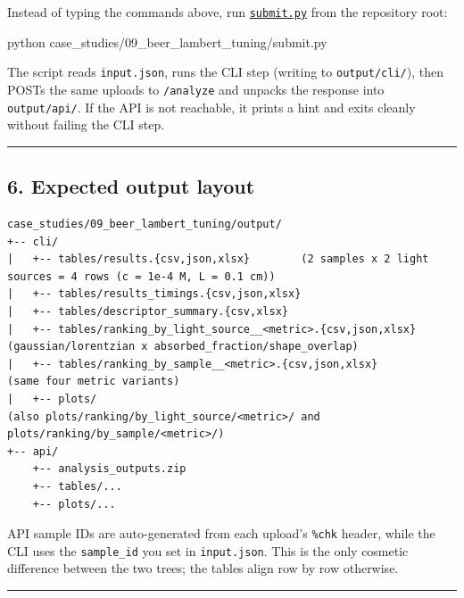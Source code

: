\documentclass[
  11pt,
]{article}
\newenvironment{Shaded}{}{}
\newcommand{\ExtensionTok}[1]{#1}
\newcommand{\NormalTok}[1]{#1}
\begin{document}
Instead of typing the commands above, run
\href{https://github.com/pinarsyt/overlap-calculator/blob/main/case_studies/09_beer_lambert_tuning/submit.py}{\texttt{submit.py}}
from the repository root:

\begin{Shaded}
\begin{Highlighting}[]
\ExtensionTok{python}\NormalTok{ case\_studies/09\_beer\_lambert\_tuning/submit.py}
\end{Highlighting}
\end{Shaded}

The script reads \texttt{input.json}, runs the CLI step (writing to
\texttt{output/cli/}), then POSTs the same uploads to \texttt{/analyze}
and unpacks the response into \texttt{output/api/}. If the API is not
reachable, it prints a hint and exits cleanly without failing the CLI
step.

\begin{center}\rule{0.5\linewidth}{0.5pt}\end{center}

\hypertarget{6-expected-output-layout}{
\subsection{6. Expected output layout}\label{6-expected-output-layout}}

\begin{verbatim}
case_studies/09_beer_lambert_tuning/output/
+-- cli/
|   +-- tables/results.{csv,json,xlsx}        (2 samples x 2 light sources = 4 rows (c = 1e-4 M, L = 0.1 cm))
|   +-- tables/results_timings.{csv,json,xlsx}
|   +-- tables/descriptor_summary.{csv,xlsx}
|   +-- tables/ranking_by_light_source__<metric>.{csv,json,xlsx}   (gaussian/lorentzian x absorbed_fraction/shape_overlap)
|   +-- tables/ranking_by_sample__<metric>.{csv,json,xlsx}          (same four metric variants)
|   +-- plots/                                                      (also plots/ranking/by_light_source/<metric>/ and plots/ranking/by_sample/<metric>/)
+-- api/
    +-- analysis_outputs.zip
    +-- tables/...
    +-- plots/...
\end{verbatim}

API sample IDs are auto-generated from each upload's \texttt{\%chk}
header, while the CLI uses the \texttt{sample\_id} you set in
\texttt{input.json}. This is the only cosmetic difference between the
two trees; the tables align row by row otherwise.

\begin{center}\rule{0.5\linewidth}{0.5pt}\end{center}
\end{document}
